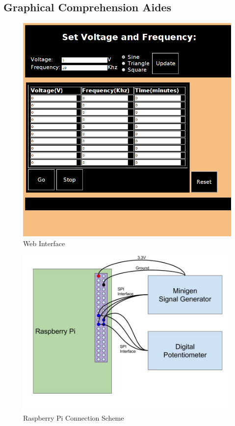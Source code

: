 \documentclass{article}	%
\begin{document}
\subsection{Graphical Comprehension Aides}
\begin{figure}[!hbt]
\begin{center}
\includegraphics[width=1.0\textwidth,keepaspectratio]{491_web_interface_good.png}
\end{center}
\caption{Web Interface}
\end{figure}

\begin{figure}[!hbt]
\begin{center}
\includegraphics[width=1.0\textwidth,keepaspectratio]{"Diagram - Pi to Minigen and MCP4131"}
\end{center}
\caption{Raspberry Pi Connection Scheme}
\end{figure}
\end{document}
